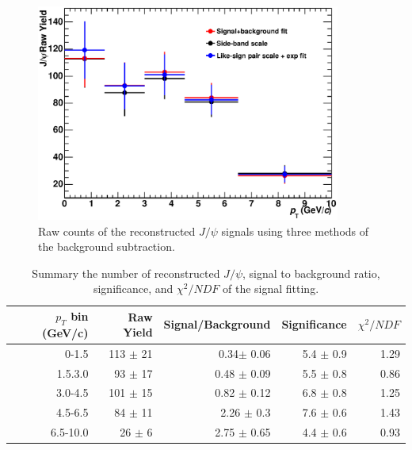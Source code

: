 \begin{figure}[!h]
  \begin{center}
    \includegraphics[width=10cm]{chap4/figure/RawYield/Rawyield_INT7_MB.eps}
  \end{center}
  \caption{Raw counts of the reconstructed $J/\psi$ signals using three methods of the background subtraction.}
  \label{fig_4_rawcounts}
\end{figure}
\begin{table}[!h]
  \centering
  \begin{tabular}{rrrrr} \hline
    $p_{T}$ bin (GeV/c) & Raw Yield & Signal/Background & Significance & $\chi^{2}/NDF$ \\ \hline
    0-1.5               &   113 $\pm$ 21  &  0.34$\pm$ 0.06    &  5.4 $\pm$ 0.9  &  1.29   \\
    1.5.3.0             &   93 $\pm$ 17   & 0.48 $\pm$ 0.09    &  5.5 $\pm$ 0.8  &  0.86    \\
    3.0-4.5             &    101 $\pm$ 15 &  0.82 $\pm$  0.12  &  6.8 $\pm$ 0.8  &  1.25\\
    4.5-6.5             &    84 $\pm$  11 &  2.26 $\pm$ 0.3    &  7.6 $\pm$ 0.6  &  1.43 \\  
    6.5-10.0            &   26 $\pm$ 6    &  2.75 $\pm$ 0.65   &  4.4 $\pm$ 0.6  &  0.93 \\  \hline
 \end{tabular}
  \caption{Summary the number of reconstructed $J/\psi$, signal to background ratio, significance, and $\chi^2/NDF$ of the signal fitting.}
\label{table_4_rawyield}
\end{table}


